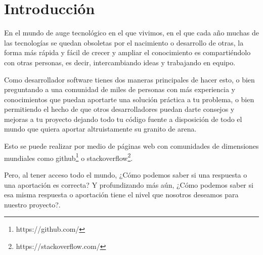 \documentclass[a4paper, 12pt]{book}
\begin{document}

\tableofcontents 
\cleardoublepage
\listoffigures %



\cleardoublepage
\chapter{Introducción}
\label{sec:intro} %

En el mundo de auge tecnológico en el que vivimos, en el que cada año muchas de las tecnologías se quedan obsoletas por el nacimiento o desarrollo de otras, la forma más rápida y fácil de crecer y ampliar el conocimiento es compartiéndolo con otras personas, es decir, intercambiando ideas y trabajando en equipo.

Como desarrollador software tienes dos maneras principales de hacer esto, o bien preguntando a una comunidad de miles de personas con más experiencia y conocimientos que puedan aportarte una solución práctica a tu problema, o bien permitiendo el hecho de que otros desarrolladores puedan darte consejos y mejoras a tu proyecto dejando todo tu código fuente a disposición de todo el mundo que quiera aportar altruistamente su granito de arena.

Esto se puede realizar por medio de páginas web con comunidades de dimensiones mundiales como github\footnote{https://github.com/} o stackoverflow\footnote{https://stackoverflow.com/}.

Pero, al tener acceso todo el mundo, ¿Cómo podemos saber si una respuesta o una aportación es correcta? Y profundizando más aún, ¿Cómo podemos saber si esa misma respuesta o aportación tiene el nivel que nosotros deseamos para nuestro proyecto?.
\end{document}
